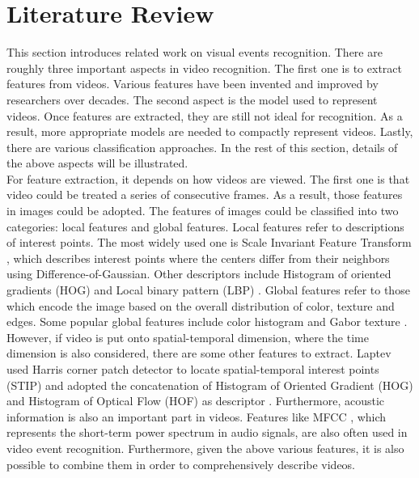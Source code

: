 \section{Literature Review}
This section introduces related work on visual events recognition. There are roughly three important aspects in video recognition. The first one is to extract features from videos. Various features have been invented and improved by researchers over decades. The second aspect is the model used to represent videos. Once features are extracted, they are still not ideal for recognition. As a result, more appropriate models are needed to compactly represent videos. Lastly, there are various classification approaches. In the rest of this section, details of the above aspects will be illustrated.\\

\noindent For feature extraction, it depends on how videos are viewed. The first one is that video could be treated a series of consecutive frames. As a result, those features in images could be adopted. The features of images could be classified into two categories: local features and global features. Local features refer to descriptions of interest points. The most widely used one is Scale Invariant Feature Transform \cite{lowe2004distinctive}, which describes interest points where the centers differ from their neighbors using Difference-of-Gaussian. Other descriptors include Histogram of oriented gradients (HOG) \cite{dalal2005histograms} and Local binary pattern (LBP) \cite{ojala2002multiresolution}. Global features refer to those which encode the image based on the overall distribution of color, texture and edges. Some popular global features include color histogram and Gabor texture \cite{manjunath1996texture}. However, if video is put onto spatial-temporal dimension, where the time dimension is also considered, there are some other features to extract. Laptev used Harris corner patch detector \cite{lindeberg1998feature} to locate spatial-temporal interest points (STIP) and adopted the concatenation of Histogram of Oriented Gradient (HOG) and Histogram of Optical Flow (HOF) as descriptor \cite{laptev2005space}. Furthermore, acoustic information is also an important part in videos. Features like MFCC \cite{baillie2003audio}, which represents the short-term power spectrum in audio signals, are also often used in video event recognition. Furthermore, given the above various features, it is also possible to combine them in order to comprehensively describe videos. \\

